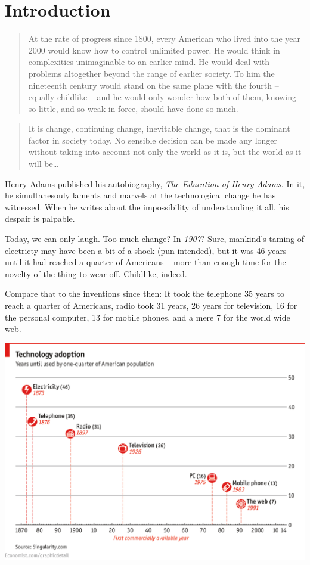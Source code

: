 \chapter{Introduction}
\begin{quote}
At the rate of progress since 1800, every American who lived into the year 2000
would know how to control unlimited power. He would think in complexities
unimaginable to an earlier mind. He would deal with problems altogether beyond
the range of earlier society. To him the nineteenth century would stand on the
same plane with the fourth -- equally childlike -- and he would only wonder how
both of them, knowing so little, and so weak in force, should have done so much.
\end{quote}

\begin{quote}
It is change, continuing change, inevitable change, that is the dominant factor
in society today. No sensible decision can be made any longer without taking
into account not only the world as it is, but the world as it will be\ldots
{}
\end{quote} 

 Henry Adams published his autobiography, \textit{The Education of Henry
Adams}. In it, he simultanesouly laments and marvels at the technological change
he has witnessed. When he writes about the impossibility of
understanding it all, his despair is palpable. 

Today, we can only laugh. Too much change? In \textit{1907}? Sure, mankind's taming of electricty may have
been a bit of a shock (pun intended), but it was 46 years until it had reached a
quarter of Americans -- more than enough time for the novelty of the thing to
wear off. Childlike, indeed.

Compare that to the inventions since then: It took the telephone 35 years to reach a quarter of Americans, radio
took 31 years, 26 years for television, 16 for the personal computer, 13 for
mobile phones, and a mere 7 for the world wide web.\bigskip

\includegraphics[width=\textwidth]{graphics/accelerating-change}
\bigskip

